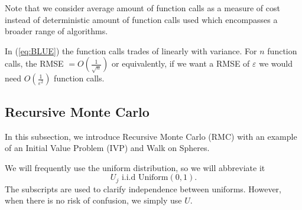 \documentclass[a4paper,12pt]{article}
\begin{document}
Note that we consider average
amount of function calls as a measure of cost instead of deterministic
amount of function calls used which encompasses a broader range of algorithms.

\begin{example}
  In (\ref{eq:BLUE}) the function calls trades of
  linearly with variance. For $n$ function calls,
  the RMSE $= O\left(\frac{1}{\sqrt{n}}\right)$ or equivalently, if we want a
  RMSE of $\varepsilon$ we would need $O\left(\frac{1}{\varepsilon^{2}}\right)$
  function calls.
\end{example}


\subsection{Recursive Monte Carlo}
In this subsection, we introduce Recursive Monte Carlo (RMC)
with an example of an Initial Value Problem (IVP) and
Walk on Spheres.

\begin{notation}[$U,U_{j}$]
  We will frequently use the uniform distribution, so we will abbreviate it
  \begin{equation}
    U_{j}  \text{ i.i.d Uniform}(0,1).
  \end{equation}
  The subscripts are used to clarify independence
  between uniforms. However,
  when there is no risk of confusion,
  we simply use $U.$
\end{notation}
\end{document}
